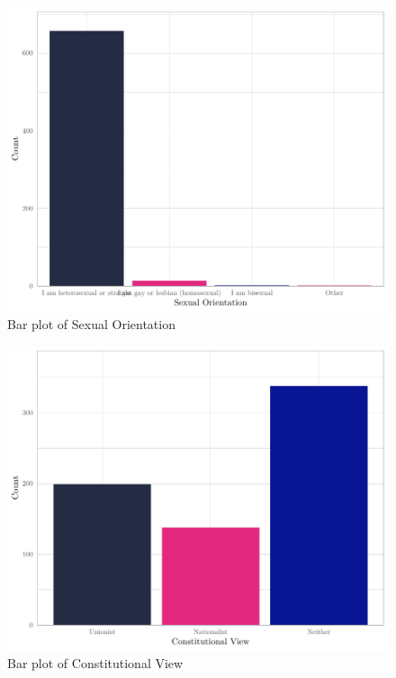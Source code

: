 \documentclass[
]{article}
\begin{document}
\begin{figure}[H]

{\centering \includegraphics[width=0.8\linewidth]{paper_files/figure-latex/unnamed-chunk-8-1} 

}

\caption{Bar plot of Sexual Orientation}\label{fig:unnamed-chunk-8}
\end{figure}

\begin{figure}[H]

{\centering \includegraphics[width=0.8\linewidth]{paper_files/figure-latex/unnamed-chunk-9-1} 

}

\caption{Bar plot of Constitutional View}\label{fig:unnamed-chunk-9}
\end{figure}
\end{document}
